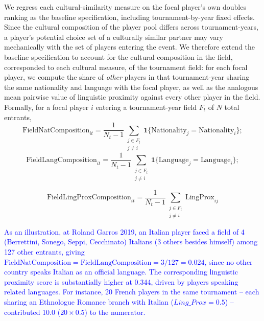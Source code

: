 \documentclass[10pt]{article}
\begin{document}
We regress each cultural-similarity measure on the focal player's own doubles ranking as the baseline specification, including tournament-by-year fixed effects. 
Since the cultural composition of the player pool differs across tournament-years, a player's potential choice set of a culturally similar partner may vary mechanically with the set of players entering the event. We therefore extend the baseline specification to account for the cultural composition in the field, corresponded to each cultural measure, of the tournament field: for each focal player, we compute the share of  \emph{other} players in that tournament-year  sharing the same nationality and language with the focal player,  as well as the analogous mean pairwise value of linguistic proximity against every other player in the field. Formally, for a focal player $i$ entering a tournament-year field $F_t$ of $N$ total entrants, 
$$\text{FieldNatComposition}_{it} = \frac{1}{N_{t} - 1} \sum_{\substack{j \in F_{t} \\ j \neq i}} \mathbf{1}\{\text{Nationality}_{j} = \text{Nationality}_{i}\};$$ 
$$\text{FieldLangComposition}_{it} = \frac{1}{N_{t} - 1} \sum_{\substack{j \in F_{t} \\ j \neq i}} \mathbf{1}\{\text{Language}_{j} = \text{Language}_{i}\};$$ 

$$\text{FieldLingProxComposition}_{it} = \frac{1}{N_{t} - 1} \sum_{\substack{j \in F_{t} \\ j \neq i}} \text{LingProx}_{ij}
$$



\textcolor{blue}{As an illustration, at Roland Garros 2019, an Italian player faced a field of 4 (Berrettini, Sonego, Seppi, Cecchinato)  Italians (3 others besides himself) among 127 other entrants, giving $\text{FieldNatComposition}=\text{FieldLangComposition}=3/127=0.024$, since no other country speaks Italian as an official language. The corresponding linguistic proximity score is substantially higher at 0.344, driven by players speaking related languages. For instance, 20 French players in the same tournament -- each sharing an Ethnologue Romance branch with Italian (\(\textit{Ling\_Prox} = 0.5\)) -- contributed 10.0 (\(20 \times 0.5\)) to the numerator. }
\end{document}
